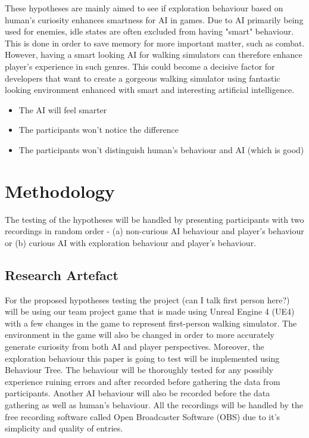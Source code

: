 \documentclass[journal]{IEEEtran}
\begin{document}
These hypotheses are mainly aimed to see if exploration behaviour based on human's curiosity enhances smartness for AI in games. Due to AI primarily being used for enemies, idle states are often excluded from having "smart" behaviour. This is done in order to save memory for more important matter, such as combat. However, having a smart looking AI for walking simulators can therefore enhance player's experience in such genres. This could become a decisive factor for developers that want to create a gorgeous walking simulator using fantastic looking environment enhanced with smart and interesting artificial intelligence.
\begin{itemize}
	\item The AI will feel smarter
	\item The participants won't notice the difference
	\item The participants won't distinguish human's behaviour and AI (which is good)
\end{itemize}

\section{Methodology}
The testing of the hypotheses will be handled by presenting participants with two recordings in random order - (a) non-curious AI behaviour and player's behaviour or (b) curious AI with exploration behaviour and player's behaviour.

\subsection{Research Artefact}
For the proposed hypotheses testing the project (can I talk first person here?) will be using our team project game that is made using Unreal Engine 4 (UE4) with a few changes in the game to represent first-person walking simulator. The environment in the game will also be changed in order to more accurately generate curiosity from both AI and player perspectives. Moreover, the exploration behaviour this paper is going to test will be implemented using Behaviour Tree. The behaviour will be thoroughly tested for any possibly experience ruining errors and after recorded before gathering the data from participants. Another AI behaviour will also be recorded before the data gathering as well as human's behaviour. All the recordings will be handled by the free recording software called Open Broadcaster Software (OBS) due to it's simplicity and quality of entries.
\end{document}
